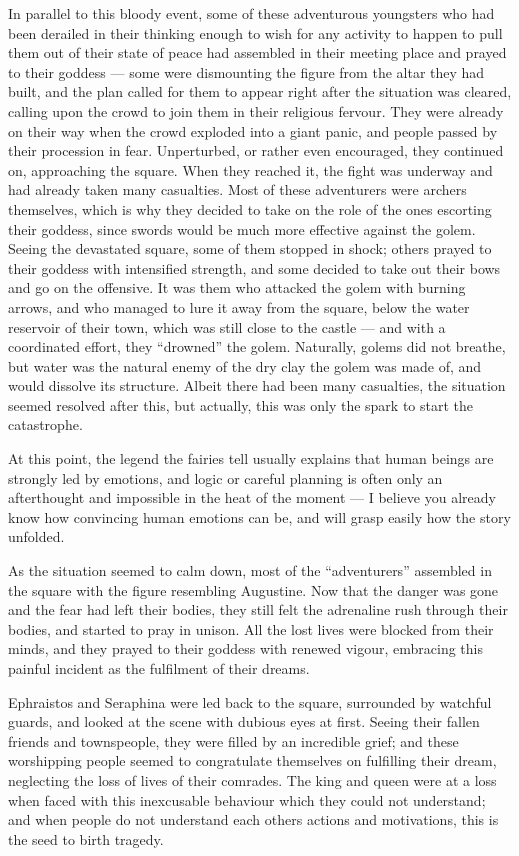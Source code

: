 In parallel to this bloody event, some of these adventurous youngsters who had been derailed in their thinking enough to wish for any activity to happen to pull them out of their state of peace had assembled in their meeting place and prayed to their goddess --- some were dismounting the figure from the altar they had built, and the plan called for them to appear right after the situation was cleared, calling upon the crowd to join them in their religious fervour. They were already on their way when the crowd exploded into a giant panic, and people passed by their procession in fear. Unperturbed, or rather even encouraged, they continued on, approaching the square. When they reached it, the fight was underway and had already taken many casualties. Most of these adventurers were archers themselves, which is why they decided to take on the role of the ones escorting their goddess, since swords would be much more effective against the golem. Seeing the devastated square, some of them stopped in shock; others prayed to their goddess with intensified strength, and some decided to take out their bows and go on the offensive. It was them who attacked the golem with burning arrows, and who managed to lure it away from the square, below the water reservoir of their town, which was still close to the castle --- and with a coordinated effort, they \enquote{drowned} the golem. Naturally, golems did not breathe, but water was the natural enemy of the dry clay the golem was made of, and would dissolve its structure. Albeit there had been many casualties, the situation seemed resolved after this, but actually, this was only the spark to start the catastrophe.

At this point, the legend the fairies tell usually explains that human beings are strongly led by emotions, and logic or careful planning is often only an afterthought and impossible in the heat of the moment --- I believe you already know how convincing human emotions can be, and will grasp easily how the story unfolded.

As the situation seemed to calm down, most of the \enquote{adventurers} assembled in the square with the figure resembling Augustine. Now that the danger was gone and the fear had left their bodies, they still felt the adrenaline rush through their bodies, and started to pray in unison. All the lost lives were blocked from their minds, and they prayed to their goddess with renewed vigour, embracing this painful incident as the fulfilment of their dreams.

Ephraistos and Seraphina were led back to the square, surrounded by watchful guards, and looked at the scene with dubious eyes at first. Seeing their fallen friends and townspeople, they were filled by an incredible grief; and these worshipping people seemed to congratulate themselves on fulfilling their dream, neglecting the loss of lives of their comrades. The king and queen were at a loss when faced with this inexcusable behaviour which they could not understand; and when people do not understand each others actions and motivations, this is the seed to birth tragedy.

